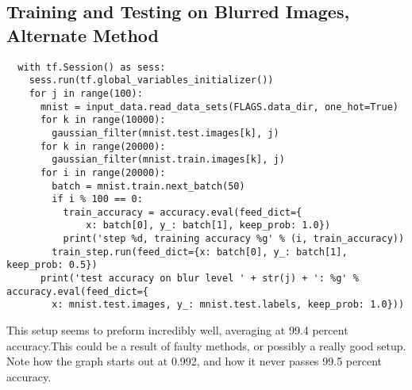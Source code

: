 \documentclass[a4paper]{article}
\begin{document}
\subsection{Training and Testing on Blurred Images, Alternate Method}
\begin{lstlisting}
  with tf.Session() as sess:
    sess.run(tf.global_variables_initializer())
    for j in range(100):
      mnist = input_data.read_data_sets(FLAGS.data_dir, one_hot=True)
      for k in range(10000):
        gaussian_filter(mnist.test.images[k], j)
      for k in range(20000):  
        gaussian_filter(mnist.train.images[k], j)
      for i in range(20000):
        batch = mnist.train.next_batch(50)
        if i % 100 == 0:
          train_accuracy = accuracy.eval(feed_dict={
              x: batch[0], y_: batch[1], keep_prob: 1.0})
          print('step %d, training accuracy %g' % (i, train_accuracy))
        train_step.run(feed_dict={x: batch[0], y_: batch[1], keep_prob: 0.5})
      print('test accuracy on blur level ' + str(j) + ': %g' % accuracy.eval(feed_dict={
        x: mnist.test.images, y_: mnist.test.labels, keep_prob: 1.0}))
\end{lstlisting}


This setup seems to preform incredibly well, averaging at 99.4 percent accuracy.This could be a result of faulty methods, or possibly a really good setup. Note how the graph starts out at 0.992, and how it never passes 99.5 percent accuracy.
\end{document}
